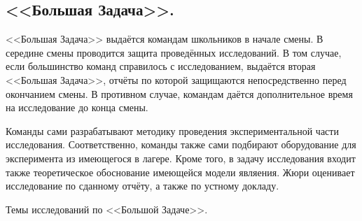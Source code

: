 \documentclass[12pt,a4paper,oneside]{scrartcl}
\newlength{\h}
\newlength{\x}
\begin{document}






\restoregeometry

\parindent=5mm
\subsection{<<Большая Задача>>.}
\label{sec:bz}

<<Большая Задача>> выдаётся командам школьников в начале смены. В
середине смены проводится защита проведённых исследований. В том
случае, если большинство команд справилось с исследованием, выдаётся
вторая <<Большая Задача>>, отчёты по которой защищаются
непосредственно перед окончанием смены. В противном случае, командам
даётся дополнительное время на исследование до конца смены.

Команды сами разрабатывают методику проведения экспериментальной части
исследования. Соответственно, команды также сами подбирают
оборудование для эксперимента из имеющегося в лагере. Кроме того, в
задачу исследования входит также теоретическое обоснование имеющейся
модели являения. Жюри оценивает исследование по сданному отчёту, а
также по устному докладу. 

\begin{center}
  \textsf{Темы исследований по <<Большой Задаче>>.}
\end{center}
\end{document}

